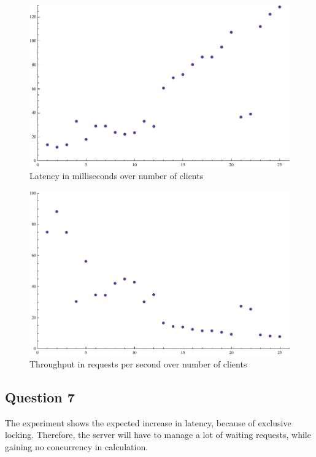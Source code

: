\documentclass[11pt,a4paper]{article}
\begin{document}
\begin{figure}[h!]
    \includegraphics[width=\textwidth]{latencygraph.pdf}
    \caption{Latency in milliseconds over number of clients}
\end{figure}
\begin{figure}[h!]
    \includegraphics[width=\textwidth]{throughputgraph.pdf}
    \caption{Throughput in requests per second over number of clients}
\end{figure}


\subsection{Question 7}
The experiment shows the expected increase in latency, because of exclusive locking.
Therefore, the server will have to manage a lot of waiting requests, while
gaining no concurrency in calculation.
\end{document}
